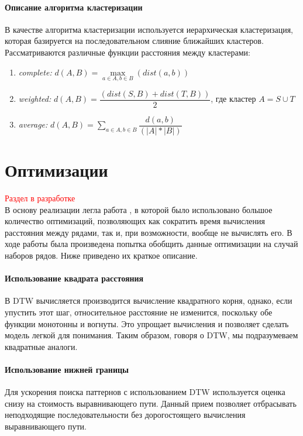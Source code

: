\documentclass[12pt,twoside]{article}
\newcommand{\fixme}[1]{\textcolor{red}{#1}}
\begin{document}
	\paragraph{Описание алгоритма кластеризации}      
        В качестве алгоритма кластеризации используется иерархическая кластеризация, которая базируется на последовательном слияние ближайших кластеров.
        Рассматриваются различные функции расстояния между кластерами: 
        \begin{enumerate}
            \item \textit{complete:}  $d(A, B) = \max\limits_{a \in A, b \in B}(dist(a, b))$ 
            \item \textit{weighted:}  $d(A,B) = \dfrac{(dist(S,B) + dist(T,B))}{2}$, где кластер $A = S \cup T$
            \item \textit{average:}   $d(A,B) = \sum\limits_{a \in A, b \in B} \dfrac{d(a, b)}{(|A|*|B|)}$ 
        \end{enumerate} 
                
    \section{Оптимизации}
        \fixme{\Large{Раздел в разработке}\\}
        В основу реализации легла работа \cite{Rakthanmanon:2012:SMT:2339530.2339576}, в которой было использовано большое количество оптимизаций, позволяющих как сократить время вычисления расстояния между рядами, так и, при возможности, вообще не вычислять его. В ходе работы была произведена попытка обобщить данные оптимизации на случай наборов рядов. Ниже приведено их краткое описание. 

        \paragraph{Использование квадрата расстояния}	
        В DTW вычисляется производится вычисление квадратного корня, однако, если упустить этот шаг, относительное расстояние не изменится, поскольку обе функции монотонны и вогнуты. Это упрощает вычисления и позволяет сделать модель легкой для понимания. Таким образом, говоря о DTW, мы подразумеваем квадратные аналоги.
        
        \paragraph{Использование нижней границы}
        Для ускорения поиска паттернов с использованием DTW используется оценка снизу на стоимость выравнивающего пути.
        Данный прием позволяет отбрасывать неподходящие последовательности без дорогостоящего вычисления выравнивающего пути. 
        
\end{document}
